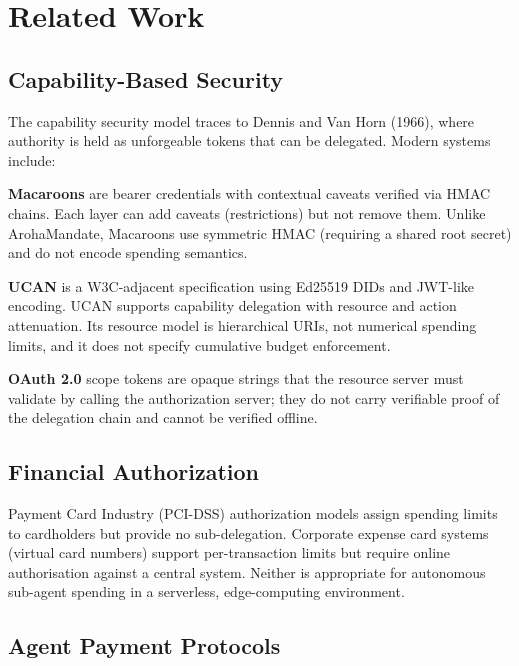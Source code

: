 \documentclass[conference]{IEEEtran}
\begin{document}
\section{Related Work}
\label{sec:related}

\subsection{Capability-Based Security}

The capability security model traces to Dennis and Van Horn
(1966), where authority is held as unforgeable tokens that
can be delegated.  Modern systems include:

\textbf{Macaroons} \cite{birgisson2014macaroons} are bearer
credentials with contextual caveats verified via HMAC
chains.  Each layer can add caveats (restrictions) but not
remove them.  Unlike ArohaMandate, Macaroons use symmetric
HMAC (requiring a shared root secret) and do not encode
spending semantics.

\textbf{UCAN} \cite{fission2022ucan} is a W3C-adjacent
specification using Ed25519 DIDs and JWT-like encoding.
UCAN supports capability delegation with resource and action
attenuation.  Its resource model is hierarchical URIs, not
numerical spending limits, and it does not specify cumulative
budget enforcement.

\textbf{OAuth 2.0} \cite{acme2019rfc} scope tokens are
opaque strings that the resource server must validate by
calling the authorization server; they do not carry
verifiable proof of the delegation chain and cannot be
verified offline.

\subsection{Financial Authorization}

Payment Card Industry (PCI-DSS) authorization models assign
spending limits to cardholders but provide no sub-delegation.
Corporate expense card systems (virtual card numbers) support
per-transaction limits but require online authorisation
against a central system. Neither is appropriate for
autonomous sub-agent spending in a serverless, edge-computing
environment.

\subsection{Agent Payment Protocols}
\end{document}
